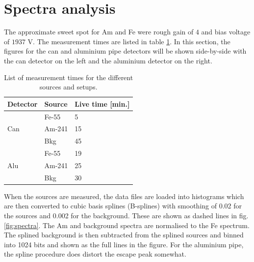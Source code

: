 \section{Spectra analysis}
The approximate sweet spot for Am and Fe were rough gain of $4$ and bias voltage of $1937$ V. The measurement times are listed in table \ref{tab:measurementstimes}. In this section, the figures for the can and aluminium pipe detectors will be shown side-by-side with the can detector on the left and the aluminium detector on the right.

\begin{table}[hb!]
\begin{tabular}{lll}
\textbf{Detector}    & \textbf{Source} & \textbf{Live time {[}min.{]}} \\ \hline
\multirow{3}{*}{Can} & Fe-55           & 5                          \\
                     & Am-241          & 15                         \\
                     & Bkg             & 45                         \\ \hline
\multirow{3}{*}{Alu} & Fe-55           & 19                         \\
                     & Am-241          & 25                         \\
                     & Bkg             & 30                         \\ \hline
\end{tabular}
\caption{List of measurement times for the different sources and setups.}
\label{tab:measurementstimes}
\end{table}

When the sources are measured, the data files are loaded into histograms which are then converted to cubic basis splines (B-splines) with smoothing of 0.02 for the sources and 0.002 for the background. These are shown as dashed lines in fig. \ref{fig:spectra}. The Am and background spectra are normalised to the Fe spectrum. The splined background is then subtracted from the splined sources and binned into 1024 bits and shown as the full lines in the figure. For the aluminium pipe, the spline procedure does distort the escape peak somewhat.

